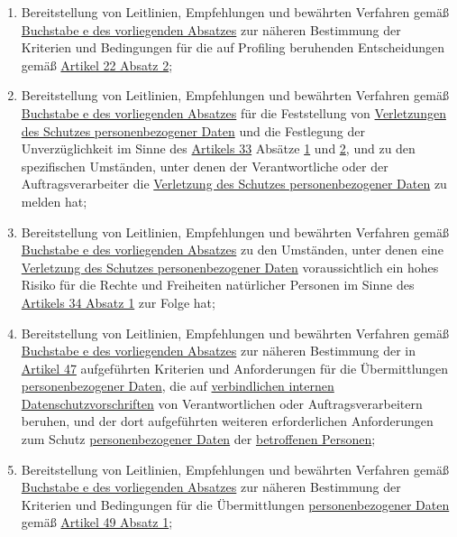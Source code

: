 \begin{enumerate}
\begin{enumerate}
    \item Bereitstellung von Leitlinien, Empfehlungen und bewährten Verfahren gemäß \hyperref[itm:70-1e]{Buchstabe e des
     vorliegenden Absatzes} zur näheren Bestimmung der Kriterien und Bedingungen für die auf Profiling beruhenden
     Entscheidungen gemäß \hyperref[itm:22-2]{Artikel 22 Absatz 2};
    \label{itm:70-1f}

    \item Bereitstellung von Leitlinien, Empfehlungen und bewährten Verfahren gemäß \hyperref[itm:70-1e]{Buchstabe e des
     vorliegenden Absatzes} für die Feststellung von \hyperref[itm:04-12]{Verletzungen des Schutzes personenbezogener Daten} und die
     Festlegung der Unverzüglichkeit im Sinne des \hyperref[ch:33]{Artikels 33} Absätze \hyperref[itm:33-1]{1} und
     \hyperref[itm:33-2]{2}, und zu den spezifischen Umständen, unter denen der Verantwortliche oder der
     Auftragsverarbeiter die \hyperref[itm:04-12]{Verletzung des Schutzes personenbezogener Daten} zu melden hat;
    \label{itm:70-1g}

    \item Bereitstellung von Leitlinien, Empfehlungen und bewährten Verfahren gemäß \hyperref[itm:70-1e]{Buchstabe e des
     vorliegenden Absatzes} zu den Umständen, unter denen eine \hyperref[itm:04-12]{Verletzung des Schutzes personenbezogener Daten}
     voraussichtlich ein hohes Risiko für die Rechte und Freiheiten natürlicher Personen im Sinne des \hyperref
     [itm:34-1]{Artikels 34 Absatz 1} zur Folge hat;
    \label{itm:70-1h}

    \item Bereitstellung von Leitlinien, Empfehlungen und bewährten Verfahren gemäß \hyperref[itm:70-1e]{Buchstabe e des
     vorliegenden Absatzes} zur näheren Bestimmung der in \hyperref[ch:47]{Artikel 47} aufgeführten Kriterien und
     Anforderungen für die Übermittlungen \hyperref[itm:04-1]{personenbezogener Daten}, die auf \hyperref[itm:04-20]{verbindlichen internen
     Datenschutzvorschriften} von Verantwortlichen oder Auftragsverarbeitern beruhen, und der dort aufgeführten weiteren
     erforderlichen Anforderungen zum Schutz \hyperref[itm:04-1]{personenbezogener Daten} der \hyperref[itm:04-1]{betroffenen Personen};
    \label{itm:70-1i}

    \item Bereitstellung von Leitlinien, Empfehlungen und bewährten Verfahren gemäß \hyperref[itm:70-1e]{Buchstabe e des
     vorliegenden Absatzes} zur näheren Bestimmung der Kriterien und Bedingungen für die Übermittlungen
     \hyperref[itm:04-1]{personenbezogener Daten} gemäß \hyperref[itm:49-1-1]{Artikel 49 Absatz 1};
    \label{itm:70-1j}


\end{enumerate}
\end{enumerate}
